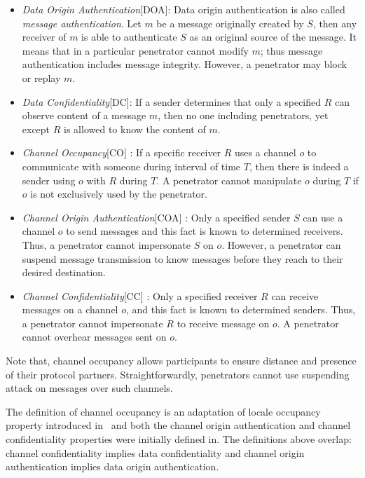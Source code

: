 \begin{itemize}
\item \emph{Data Origin Authentication}[DOA]: Data origin authentication is also called \emph{message authentication}. Let $m$ be a message originally created by $S$, then any receiver of $m$ is able to authenticate $S$ as an original source of the message. It means that in a particular penetrator cannot modify $m$; thus message authentication includes message integrity. However, a penetrator may block or replay $m$. 
\item \emph{Data Confidentiality}[DC]: If a sender determines that only a specified $R$ can observe content of a message $m$, then no one including penetrators, yet except $R$ is allowed to know the content of $m$.
\item \emph{Channel Occupancy}[CO] : If a specific receiver $R$ uses a channel $o$ to communicate with someone during interval of time $T$, then there is indeed a sender using $o$ with $R$ during $T$. A penetrator cannot manipulate $o$ during $T$ if $o$ is not exclusively used by the penetrator. 
\item \emph{Channel Origin Authentication}[COA] \cite{Mausch94}: Only a specified sender $S$ can use a channel $o$ to send messages and this fact is known to determined receivers. Thus, a penetrator cannot impersonate $S$ on $o$. However, a penetrator can suspend message transmission to know messages before they reach to their desired destination. 
\item \emph{Channel Confidentiality}[CC] \cite{Mausch94}: Only a specified receiver $R$ can receive messages on a channel $o$, and this fact is known to determined senders. Thus, a penetrator cannot impersonate $R$ to receive message on $o$. A penetrator cannot overhear messages sent on $o$.
\end{itemize} 

Note that, channel occupancy allows participants to ensure distance and presence of their protocol partners. Straightforwardly, penetrators cannot use suspending attack on messages over such channels.

The definition of channel occupancy is an adaptation of locale occupancy property introduced in~\cite{Thayer:2010aa} and both the channel origin authentication and channel confidentiality properties were initially defined in\cite{Mausch94}. The definitions above overlap: channel confidentiality implies data confidentiality and channel origin authentication implies data origin authentication.

